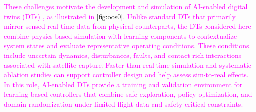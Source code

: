 \documentclass{ieeeaccess}
\begin{document}
\textcolor{magenta}{These challenges motivate the development and simulation of AI-enabled digital twins 
(DTs) \cite{kaigom2025deep}, as illustrated in \cref{fig:oos0}. Unlike standard DTs that primarily mirror 
sensed real-time data from physical counterparts, the DTs considered here combine physics-based simulation 
with learning components to contextualize system states and evaluate representative operating conditions. 
These conditions include uncertain dynamics, disturbances, faults, and contact-rich interactions associated 
with satellite capture. Faster-than-real-time simulation and systematic ablation studies can support 
controller design and help assess sim-to-real effects. In this role, AI-enabled DTs provide a training 
and validation environment for learning-based controllers that combine safe exploration, policy optimization, 
and domain randomization under limited flight data and safety-critical constraints.}
\end{document}
